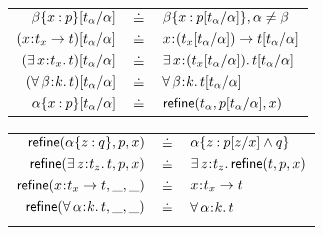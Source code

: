 \begin{figure}%
  \begin{tabular}{r@{\hskip 0.05in}c@{\hskip 0.05in}l}
  $\subst{\breft{\tvarb}{x}{p}}{\al}{t_\al}$       & $\defeq$ & $\breft{\tvarb}{x}{\subst{p}{\al}{t_\al}}, \al \not = \tvarb$ \\ 
  $\subst{(\functype{x}{t_x}{t})}{\al}{t_\al}$     & $\defeq$ & $\functype{x}{(\subst{t_x}{\al}{t_\al})}{\subst{t}{\al}{t_\al}}$ \\ 
  $\subst{(\existype{x}{t_x}{t})}{\al}{t_\al}$     & $\defeq$ & $\existype{x}{(\subst{t_x}{\al}{t_\al})}{\subst{t}{\al}{t_\al}}$ \\ 
  $\subst{(\polytype{\tvarb}{k}{t})}{\al}{t_\al}$  & $\defeq$ & $\polytype{\tvarb}{k}{\subst{t}{\al}{t_\al}}$ \\
  $\subst{\breft{\al}{x}{p}}{\al}{t_\al}$          & $\defeq$ & $\strengthen{t_\al}{\subst{p}{\al}{t_\al}}{x}$ \\
  \end{tabular}
  \begin{tabular}{r@{\hskip 0.05in}c@{\hskip 0.05in}l}
  $\strengthen{\breft{\al}{z}{q}}{p}{x}$           & $\defeq$ & $\breft{\al}{z}{\subst{p}{x}{z} \wedge q}$ \\
  $\strengthen{\existype{z}{t_z}{t}}{p}{x}$        & $\defeq$ & $\existype{z}{t_z}{\strengthen{t}{p}{x}}$ \\
  $\strengthen{\functype{x}{t_x}{t}}{\_}{\_}$      & $\defeq$ & $\functype{x}{t_x}{t}$ \\
  $\strengthen{\polytype{\al}{k}{t}}{\_}{\_}$      & $\defeq$ & $\polytype{\al}{k}{t}$ \\
  && \\
  \end{tabular}

\end{figure}

